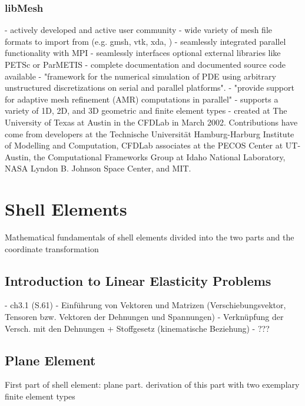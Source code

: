\documentclass[11pt,twoside]{scrartcl}
\begin{document}
  \subsubsection{libMesh}\cite{libmesh}
  - actively developed and active user community\newline
  - wide variety of mesh file formats to import from (e.g. gmsh, vtk, xda, )\newline
  - seamlessly integrated parallel functionality with MPI\newline
  - seamlessly interfaces optional external libraries like PETSc or ParMETIS\newline
  - complete documentation and documented source code available\newline
  - "framework for the numerical simulation of PDE using arbitrary unstructured discretizations on serial and parallel platforms".\newline
  - "provide support for adaptive mesh refinement (AMR) computations in parallel"\newline
  - supports a variety of 1D, 2D, and 3D geometric and finite element types\newline
  - created at The University of Texas at Austin in the CFDLab in March 2002. Contributions have come from developers at the Technische Universität Hamburg-Harburg Institute of Modelling and Computation, CFDLab associates at the PECOS Center at UT-Austin, the Computational Frameworks Group at Idaho National Laboratory, NASA Lyndon B. Johnson Space Center, and MIT.
\newpage
\section{Shell Elements}
Mathematical fundamentals of shell elements divided into the two parts and the coordinate transformation
 \subsection{Introduction to Linear Elasticity Problems}
 - \cite{steinke2005finite} ch3.1 (S.61)\newline
 - Einführung von Vektoren und Matrizen (Verschiebungsvektor, Tensoren bzw. Vektoren der Dehnungen und Spannungen)\newline
 - Verknüpfung der Versch. mit den Dehnungen + Stoffgesetz (kinematische Beziehung)\newline
 - ???
 \subsection{Plane Element}
 First part of shell element: plane part. derivation of this part with two exemplary finite element types
\end{document}
